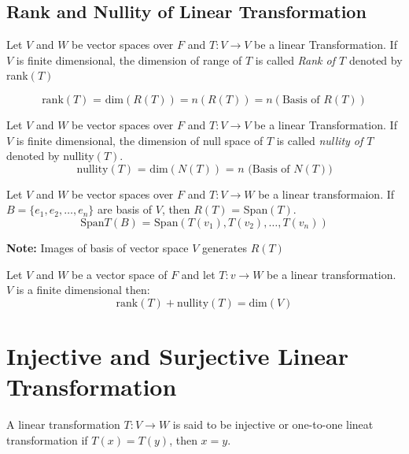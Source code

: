 \documentclass[english,course,fleqn]{lecture}
\newcommand{\Q}{\bigskip\bfseries \item}
\begin{document}
\subsection{Rank and Nullity of Linear Transformation}


\begin{definition}[Rank of $T$]
  
Let $V$ and $W$ be vector spaces over $F$ and $T:V\rightarrow V$ be a linear Transformation.
If $V$ is finite dimensional, the dimension of range of $T$ is called \textit{Rank of $T$} denoted by rank$(T)$ \Q 
  \[
  \text{rank$(T)$ = dim$(R(T))$} = n(R(T)) = n(\text{Basis of $R(T)$})
\]
\end{definition}


\begin{definition}[Nullity of $T$]
  
  Let $V$ and $W$ be vector spaces over $F$ and $T:V\rightarrow V$ be a linear Transformation.
  If $V$ is finite dimensional, the dimension of  null space of $T$ is called \textit{nullity of $T$} denoted by nullity$(T)$.
  \[
    \text{nullity$(T)$ = dim$(N(T))$ = $n$ (Basis of $N(T)$)}
  \]
\end{definition}


\begin{definition}[Span$(T)$]
  Let $V$ and $W$ be vector spaces over $F$ and $T:V \rightarrow W$ be a linear transformaion.
  If $B = \{e_{1}, e_{2}, \ldots, e_{n}\}$ are basis of $V$, then $R(T)$ = Span$(T)$.
  \[
    \text{Span$T(B)$ = Span}(T(v_{1}), T(v_{2}), \ldots, T(v_{n}))
  \]
\end{definition}


\textbf{Note:} Images of basis of vector space $V$ generates $R(T)$

\begin{theorem}
  Let $V$ and $W$ be a vector space of $F$ and let $T:v\rightarrow W$ be a linear transformation.
  $V$ is a finite dimensional then:
  \[
    \text{rank}(T) + \text{nullity}(T) = \text{dim}(V)
  \]
\end{theorem}

\newpage

\section{Injective and Surjective Linear Transformation}

\begin{definition}
  A linear transformation $T:V \rightarrow W$ is said to be injective or one-to-one lineat transformation
  if $T(x) = T(y)$, then $x = y$.
\end{definition}
\end{document}
